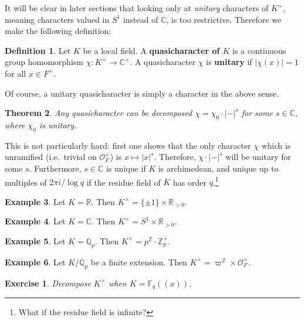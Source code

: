 \documentclass[11pt]{report}
\let\mc\mathcal
\newcommand{\1}{\mathbbm 1}
\newcommand{\Z}{\mathbb{Z}}
\newcommand{\Q}{\mathbb{Q}}
\newcommand{\R}{\mathbb{R}}
\newcommand{\F}{\mathbb{F}}
\newcommand{\C}{\mathbb{C}}
\renewcommand{\O}{\mc O}
\theoremstyle{plain}
\newtheorem{thm}{Theorem}[section]
\newcounter{ex}
\newtheorem{exercise}[ex]{Exercise}
\theoremstyle{definition}
\newtheorem{mydef}[thm]{Definition}
\newtheorem{example}[thm]{Example}
\theoremstyle{remark}
\numberwithin{equation}{section}
\begin{document}
It will be clear in later sections that looking only at \emph{unitary}
characters of $K^{\times}$, meaning characters valued in $S^{1}$ instead of
$\C$, is too restrictive. Therefore we make the
following definition:

\begin{mydef}
Let $K$ be a local field. A \textbf{quasicharacter of $K$} is a
continuous group homomorphism $\chi \colon K^{\times} \to \C^{\times}$. A
quasicharacter $\chi$ is \textbf{unitary} if $|\chi(x)| =1$ for all $x \in
F^{\times}$. 
\end{mydef}
Of course, a unitary quasicharacter is simply a character in the above sense.

\begin{thm}
Any quasicharacter can be decomposed $\chi = \chi_{0} \cdot |{-}|^{s}$ for some
$s\in \C$, where $\chi_{0}$ is unitary. 
\end{thm}
This is not particularly hard: first one shows that the only character
$\chi$ which is unramified (i.e.~trivial on $\O_{F}^{\times}$) is
$x \mapsto |x|^{s}$. Therefore, $\chi \cdot |{-}|^{s}$ will be unitary for some
$s$. Furthermore, $s \in \C$ is unique if $K$ is archimedean, and unique
up to multiples of $2\pi i /\log q$ if the residue field of $K$ has
order $q$.\footnote{What if the residue field is infinite?}

\begin{example}
Let $K = \R$. Then $K^{\times} = \{\pm 1\}\times \R_{>0}$. 
\end{example}

\begin{example}
Let $K = \C$. Then $K^{\times} = S^{1}\times \R_{>0}$. 
\end{example}

\begin{example}
Let $K = \Q_{p}$. Then $K^{\times} = p^{\Z} \cdot \Z_{p}^{\times}$. 
\end{example}

\begin{example}
Let $K/ \Q_{p}$ be a finite extension. Then $K^{\times} = \varpi^{\Z} \times
\O_{F}^{\times}$. 
\end{example}

\begin{exercise}
Decompose $K^{\times}$ when $K = \F_{q}((x))$.
\end{exercise}

\printbibliography%
\end{document}
